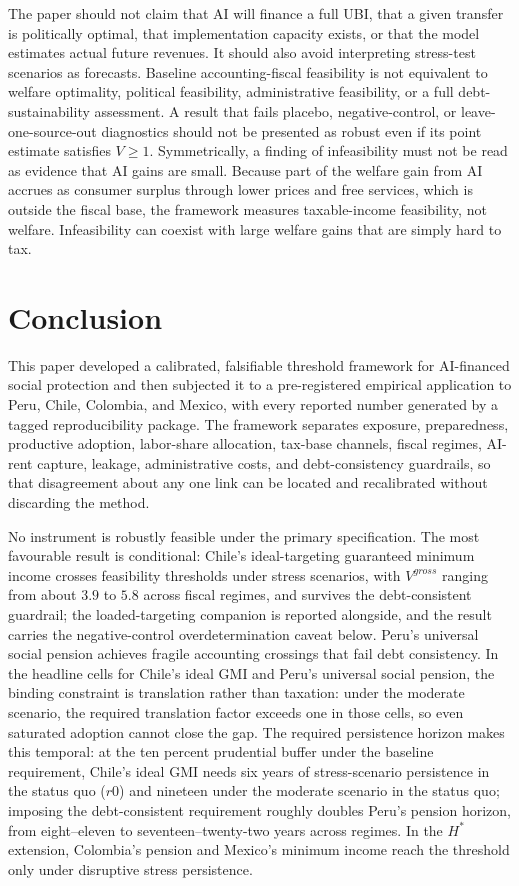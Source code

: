 \documentclass[11pt,a4paper]{article}
\begin{document}
The paper should not claim that AI will finance a full UBI, that a given transfer is politically optimal, that implementation capacity exists, or that the model estimates actual future revenues. It should also avoid interpreting stress-test scenarios as forecasts. Baseline accounting-fiscal feasibility is not equivalent to welfare optimality, political feasibility, administrative feasibility, or a full debt-sustainability assessment. A result that fails placebo, negative-control, or leave-one-source-out diagnostics should not be presented as robust even if its point estimate satisfies $V\geq1$. Symmetrically, a finding of infeasibility must not be read as evidence that AI gains are small. Because part of the welfare gain from AI accrues as consumer surplus through lower prices and free services, which is outside the fiscal base, the framework measures taxable-income feasibility, not welfare. Infeasibility can coexist with large welfare gains that are simply hard to tax.

\section{Conclusion}\label{sec:conclusion}

This paper developed a calibrated, falsifiable threshold framework for AI-financed social protection and then subjected it to a pre-registered empirical application to Peru, Chile, Colombia, and Mexico, with every reported number generated by a tagged reproducibility package. The framework separates exposure, preparedness, productive adoption, labor-share allocation, tax-base channels, fiscal regimes, AI-rent capture, leakage, administrative costs, and debt-consistency guardrails, so that disagreement about any one link can be located and recalibrated without discarding the method.

No instrument is robustly feasible under the primary specification. The most favourable result is conditional: Chile's ideal-targeting guaranteed minimum income crosses feasibility thresholds under stress scenarios, with $V^{gross}$ ranging from about $3.9$ to $5.8$ across fiscal regimes, and survives the debt-consistent guardrail; the loaded-targeting companion is reported alongside, and the result carries the negative-control overdetermination caveat below. Peru's universal social pension achieves fragile accounting crossings that fail debt consistency. In the headline cells for Chile's ideal GMI and Peru's universal social pension, the binding constraint is translation rather than taxation: under the moderate scenario, the required translation factor exceeds one in those cells, so even saturated adoption cannot close the gap. The required persistence horizon makes this temporal: at the ten percent prudential buffer under the baseline requirement, Chile's ideal GMI needs six years of stress-scenario persistence in the status quo ($r0$) and nineteen under the moderate scenario in the status quo; imposing the debt-consistent requirement roughly doubles Peru's pension horizon, from eight--eleven to seventeen--twenty-two years across regimes. In the $H^*$ extension, Colombia's pension and Mexico's minimum income reach the threshold only under disruptive stress persistence.
\end{document}
